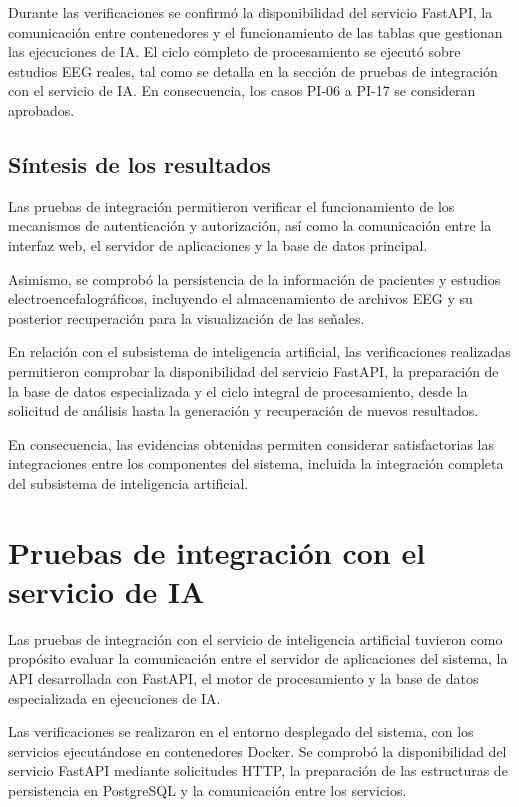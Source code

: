Durante las verificaciones se confirmó la disponibilidad del servicio FastAPI, la comunicación entre contenedores y el funcionamiento de las tablas que gestionan las ejecuciones de IA.
El ciclo completo de procesamiento se ejecutó sobre estudios EEG reales, tal como se detalla en la sección de pruebas de integración con el servicio de IA.
En consecuencia, los casos PI-06 a PI-17 se consideran aprobados.


\subsection{Síntesis de los resultados}


Las pruebas de integración permitieron verificar el funcionamiento de los mecanismos de autenticación y autorización, así como la comunicación entre la interfaz web, el servidor de aplicaciones y la base de datos principal.

Asimismo, se comprobó la persistencia de la información de pacientes y estudios electroencefalográficos, incluyendo el almacenamiento de archivos EEG y su posterior recuperación para la visualización de las señales.

En relación con el subsistema de inteligencia artificial, las verificaciones realizadas permitieron comprobar la disponibilidad del servicio FastAPI, la preparación de la base de datos especializada y el ciclo integral de procesamiento, desde la solicitud de análisis hasta la generación y recuperación de nuevos resultados.

En consecuencia, las evidencias obtenidas permiten considerar satisfactorias las integraciones entre los componentes del sistema, incluida la integración completa del subsistema de inteligencia artificial.


\section{Pruebas de integración con el servicio de IA}

Las pruebas de integración con el servicio de
inteligencia artificial tuvieron como propósito
evaluar la comunicación entre el servidor de
aplicaciones del sistema, la API desarrollada
con FastAPI, el motor de procesamiento y la
base de datos especializada en ejecuciones de IA.

Las verificaciones se realizaron en el entorno desplegado del sistema, con los servicios ejecutándose en contenedores Docker.
Se comprobó la disponibilidad del servicio FastAPI mediante solicitudes HTTP, la preparación de las estructuras de persistencia en PostgreSQL y la comunicación entre los servicios.

